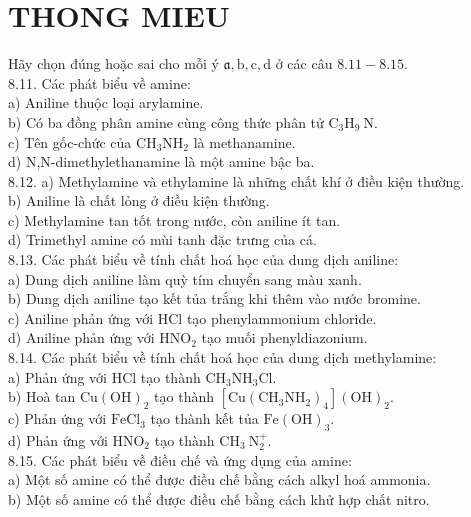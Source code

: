 \documentclass[10pt]{article}
\begin{document}
\section*{THONG MIEU}
Hãy chọn đúng hoặc sai cho mỗi ý $\mathfrak{a}, \mathrm{b}, \mathrm{c}, \mathrm{d}$ ở các câu $8.11-8.15$.\\
8.11. Các phát biểu về amine:\\
a) Aniline thuộc loại arylamine.\\
b) Có ba đồng phân amine cùng công thức phân tử $\mathrm{C}_{3} \mathrm{H}_{9} \mathrm{~N}$.\\
c) Tên gốc-chức của $\mathrm{CH}_{3} \mathrm{NH}_{2}$ là methanamine.\\
d) N,N-dimethylethanamine là một amine bậc ba.\\
8.12. a) Methylamine và ethylamine là những chất khí ở điều kiện thường.\\
b) Aniline là chất lỏng ở điều kiện thường.\\
c) Methylamine tan tốt trong nước, còn aniline ít tan.\\
d) Trimethyl amine có mùi tanh đặc trưng của cá.\\
8.13. Các phát biểu về tính chất hoá học của dung dịch aniline:\\
a) Dung dịch aniline làm quỳ tím chuyển sang màu xanh.\\
b) Dung dịch aniline tạo kết tủa trắng khi thêm vào nước bromine.\\
c) Aniline phản ứng với HCl tạo phenylammonium chloride.\\
d) Aniline phản ứng với $\mathrm{HNO}_{2}$ tạo muối phenyldiazonium.\\
8.14. Các phát biểu về tính chất hoá học của dung dịch methylamine:\\
a) Phản ứng với HCl tạo thành $\mathrm{CH}_{3} \mathrm{NH}_{3} \mathrm{Cl}$.\\
b) Hoà tan $\mathrm{Cu}(\mathrm{OH})_{2}$ tạo thành $\left[\mathrm{Cu}\left(\mathrm{CH}_{3} \mathrm{NH}_{2}\right)_{4}\right](\mathrm{OH})_{2}$.\\
c) Phản ứng với $\mathrm{FeCl}_{3}$ tạo thành kết tủa $\mathrm{Fe}(\mathrm{OH})_{3}$.\\
d) Phản ứng với $\mathrm{HNO}_{2}$ tạo thành $\mathrm{CH}_{3} \mathrm{~N}_{2}^{+}$.\\
8.15. Các phát biểu về điều chế và ứng dụng của amine:\\
a) Một số amine có thể được điều chế bằng cách alkyl hoá ammonia.\\
b) Một số amine có thể được điều chế bằng cách khử hợp chất nitro.\\
\end{document}
